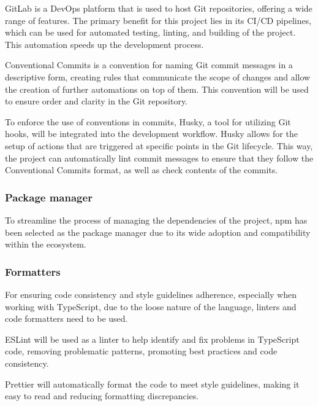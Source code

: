 GitLab is a DevOps platform that is used to host Git repositories, offering a wide range of features. The primary benefit for this project lies in its CI/CD pipelines, which can be used for automated testing, linting, and building of the project. This automation speeds up the development process. \cite{GitLab}

Conventional Commits is a convention for naming Git commit messages in a descriptive form, creating rules that communicate the scope of changes and allow the creation of further automations on top of them. This convention will be used to ensure order and clarity in the Git repository. \cite{ConventionalCommits}

To enforce the use of conventions in commits, Husky, a tool for utilizing Git hooks, will be integrated into the development workflow. Husky allows for the setup of actions that are triggered at specific points in the Git lifecycle. This way, the project can automatically lint commit messages to ensure that they follow the Conventional Commits format, as well as check contents of the commits. \cite{Husky}

\subsubsection{Package manager}

To streamline the process of managing the dependencies of the project, npm has been selected as the package manager due to its wide adoption and compatibility within the ecosystem. \cite{Abramowski2022}

\subsubsection{Formatters}

For ensuring code consistency and style guidelines adherence, especially when working with TypeScript, due to the loose nature of the language, linters and code formatters need to be used.

ESLint will be used as a linter to help identify and fix problems in TypeScript code, removing problematic patterns, promoting best practices and code consistency. \cite{Gupta2021}

Prettier will automatically format the code to meet style guidelines, making it easy to read and reducing formatting discrepancies. \cite{Wojtasinski2023}


